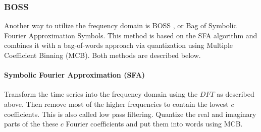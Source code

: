 \subsubsection{BOSS}
Another way to utilize the frequency domain is BOSS \cite{schafer2015boss} , or Bag of Symbolic Fourier Approximation Symbols.
This method is based on the SFA algorithm and combines it with a bag-of-words approach via quantization using Multiple Coefficient Binning (MCB). Both methods are described below.
\paragraph{Symbolic Fourier Approximation (SFA)}
Transform the time series into the frequency domain using the $DFT$ as described above. Then remove most of the higher frequencies to contain the lowest $c$ coefficients. This is also called low pass filtering. Quantize the real and imaginary parts of the these $c$ Fourier coefficients and put them into words using MCB.
